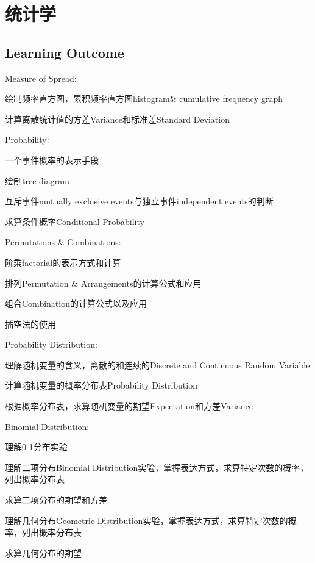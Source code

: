 \chapter{统计学}

\section{Learning Outcome}
Measure of Spread:
\begin{todolist}
\item 绘制频率直方图，累积频率直方图histogram\& cumulative frequency graph
\item 计算离散统计值的方差Variance和标准差Standard Deviation
\end{todolist}
\par

Probability:
\begin{todolist}
\item 一个事件概率的表示手段
\item 绘制tree diagram
\item 互斥事件mutually exclusive events与独立事件independent events的判断
\item 求算条件概率Conditional Probability
\end{todolist}
\par

Permutations \& Combinations:
\begin{todolist}
\item 阶乘factorial的表示方式和计算
\item 排列Permutation \& Arrangements的计算公式和应用
\item 组合Combination的计算公式以及应用
\item 插空法的使用
\end{todolist}
\par

Probability Distribution:
\begin{todolist}
\item 理解随机变量的含义，离散的和连续的Discrete and Continuous Random Variable
\item 计算随机变量的概率分布表Probability Distribution
\item 根据概率分布表，求算随机变量的期望Expectation和方差Variance
\end{todolist}
\clearpage

Binomial Distribution:
\begin{todolist}
\item 理解0-1分布实验
\item 理解二项分布Binomial Distribution实验，掌握表达方式，求算特定次数的概率，列出概率分布表
\item 求算二项分布的期望和方差
\item 理解几何分布Geometric Distribution实验，掌握表达方式，求算特定次数的概率，列出概率分布表
\item 求算几何分布的期望
\end{todolist}
\par

